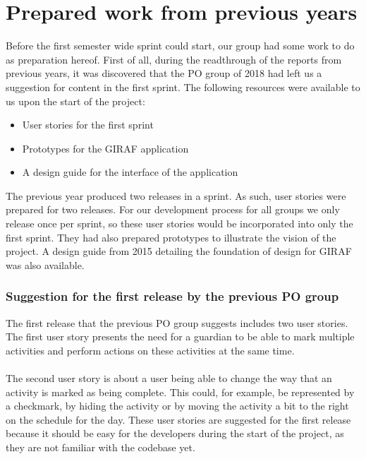 \section{Prepared work from previous years}\label{prepared-work-from-previous-years}
Before the first semester wide sprint could start, our group had some work to do as preparation hereof.
First of all, during the readthrough of the reports from previous years, it was discovered that the PO group of 2018 had left us a suggestion for content in the first sprint.
The following resources were available to us upon the start of the project:
\begin{itemize}
    \item User stories for the first sprint
    \item Prototypes for the GIRAF application
    \item A design guide for the interface of the application
\end{itemize}
The previous year produced two releases in a sprint.
As such, user stories were prepared for two releases.
For our development process for all groups we only release once per sprint, so these user stories would be incorporated into only the first sprint.
They had also prepared prototypes to illustrate the vision of the project.
A design guide from 2015 detailing the foundation of design for GIRAF was also available. 

\subsubsection{Suggestion for the first release by the previous PO group}
The first release that the previous PO group suggests includes two user stories.
The first user story presents the need for a guardian to be able to mark multiple activities and perform actions on these activities at the same time.
\\\\
The second user story is about a user being able to change the way that an activity is marked as being complete.
This could, for example, be represented by a checkmark, by hiding the activity or by moving the activity a bit to the right on the schedule for the day.
These user stories are suggested for the first release because it should be easy for the developers during the start of the project, as they are not familiar with the codebase yet.

